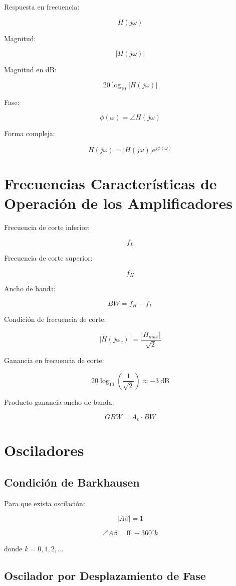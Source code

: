 \documentclass{article}
\begin{document}
Respuesta en frecuencia:

$$
H(j\omega)
$$

Magnitud:

$$
|H(j\omega)|
$$

Magnitud en dB:

$$
20\log_{10}|H(j\omega)|
$$

Fase:

$$
\phi(\omega)=\angle H(j\omega)
$$

Forma compleja:

$$
H(j\omega)=|H(j\omega)|e^{j\phi(\omega)}
$$

\section{Frecuencias Características de Operación de los Amplificadores}

Frecuencia de corte inferior:

$$
f_L
$$

Frecuencia de corte superior:

$$
f_H
$$

Ancho de banda:

$$
BW=f_H-f_L
$$

Condición de frecuencia de corte:

$$
|H(j\omega_c)|=
\frac{|H_{max}|}{\sqrt{2}}
$$

Ganancia en frecuencia de corte:

$$
20\log_{10}
\left(
\frac{1}{\sqrt{2}}
\right)
\approx -3\ \text{dB}
$$

Producto ganancia-ancho de banda:

$$
GBW=A_v \cdot BW
$$

\section{Osciladores}

\subsection{Condición de Barkhausen}

Para que exista oscilación:

$$
|A\beta|=1
$$

$$
\angle A\beta = 0^\circ + 360^\circ k
$$

donde $k=0,1,2,\ldots$

\subsection{Oscilador por Desplazamiento de Fase}
\end{document}
